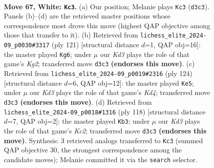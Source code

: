 \documentclass[11pt]{article}
\begin{document}
\clearpage

\begin{figure}[p]\centering
\begin{subfigure}{0.46\textwidth}\centering
\resizebox{\linewidth}{!}{%
\newchessgame
\chessboard[
  setfen={8/8/pp5k/8/q1P5/3K4/8/8 w - - 2 67},
  showmover=false,
  pgfstyle=straightmove, color=movearrow, markmove={d3-c3}
]}
\caption{}
\end{subfigure}\hfill
\begin{subfigure}{0.46\textwidth}\centering
\resizebox{\linewidth}{!}{%
\newchessgame
\chessboard[
  setfen={8/6k1/4Qp2/8/5PP1/8/6K1/8 b - - 1 61},
  showmover=false,
  pgfstyle=straightmove, color=movearrow, markmove={g7-g6}
]}
\caption{}
\end{subfigure}
\\[4pt]
\begin{subfigure}{0.46\textwidth}\centering
\resizebox{\linewidth}{!}{%
\newchessgame
\chessboard[
  setfen={6k1/5p2/2q4p/2P5/3K4/8/8/8 w - - 1 63},
  showmover=false,
  pgfstyle=straightmove, color=movearrow, markmove={d4-e5}
]}
\caption{}
\end{subfigure}\hfill
\begin{subfigure}{0.46\textwidth}\centering
\resizebox{\linewidth}{!}{%
\newchessgame
\chessboard[
  setfen={8/8/p1q5/P5k1/8/8/2K5/8 w - - 0 60},
  showmover=false,
  pgfstyle=straightmove, color=movearrow, markmove={c2-b3}
]}
\caption{}
\end{subfigure}
\caption{\textbf{Move 67, White: \texttt{Kc3}.} (a) Our position; Melanie plays \texttt{Kc3} (\texttt{d3c3}). Panels (b)--(d) are the retrieved master positions whose correspondence most drove this move (highest QAP objective among those that transfer to it). (b) Retrieved from \texttt{lichess\_elite\_2024-09\_p0030\#3317} (ply 121) [structural distance $d$=1, QAP obj=16]: the master played \texttt{Kg6}; under $\mu$ our \emph{Kd3} plays the role of that game's \emph{Kg2}; transferred move \texttt{d3c3} \textbf{(endorses this move)}. (c) Retrieved from \texttt{lichess\_elite\_2024-09\_p0019\#2316} (ply 124) [structural distance $d$=6, QAP obj=12]: the master played \texttt{Ke5}; under $\mu$ our \emph{Kd3} plays the role of that game's \emph{Kd4}; transferred move \texttt{d3c3} \textbf{(endorses this move)}. (d) Retrieved from \texttt{lichess\_elite\_2024-09\_p0018\#1316} (ply 118) [structural distance $d$=7, QAP obj=2]: the master played \texttt{Kb3}; under $\mu$ our \emph{Kd3} plays the role of that game's \emph{Kc2}; transferred move \texttt{d3c3} \textbf{(endorses this move)}. Synthesis: 3 retrieved analogs transferred to \texttt{Kc3} (summed QAP objective 30, the strongest correspondence among the candidate moves); Melanie committed it via the \texttt{search} selector.}
\label{fig:thought-m132}
\end{figure}
\end{document}
